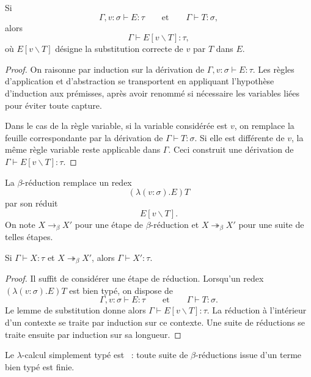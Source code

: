 \begin{lem}[Substitution]\label{substitution-lemma}
Si
\[
\Gamma,v:\sigma\vdash E:\tau
\qquad\text{et}\qquad
\Gamma\vdash T:\sigma,
\]
alors
\[
\Gamma\vdash E[v\backslash T]:\tau,
\]
où $E[v\backslash T]$ désigne la substitution correcte de $v$ par $T$
dans $E$.
\end{lem}

\begin{proof}
On raisonne par induction sur la dérivation de
$\Gamma,v:\sigma\vdash E:\tau$. Les règles d'application et
d'abstraction se transportent en appliquant l'hypothèse d'induction aux
prémisses, après avoir renommé si nécessaire les variables liées pour
éviter toute capture.

Dans le cas de la règle variable, si la variable considérée est $v$,
on remplace la feuille correspondante par la dérivation de
$\Gamma\vdash T:\sigma$. Si elle est différente de $v$, la même règle
variable reste applicable dans $\Gamma$. Ceci construit une dérivation
de $\Gamma\vdash E[v\backslash T]:\tau$.
\end{proof}

\thingy La $\beta$-réduction remplace un redex
\[
(\lambda(v:\sigma).E)T
\]
par son réduit
\[
E[v\backslash T].
\]
On note $X\rightarrow_\beta X'$ pour une étape de
$\beta$-réduction et $X\twoheadrightarrow_\beta X'$ pour une suite de
telles étapes.

\begin{prop}
Si $\Gamma\vdash X:\tau$ et
$X\twoheadrightarrow_\beta X'$, alors
$\Gamma\vdash X':\tau$.
\end{prop}

\begin{proof}
Il suffit de considérer une étape de réduction. Lorsqu'un redex
$(\lambda(v:\sigma).E)T$ est bien typé, on dispose de
\[
\Gamma,v:\sigma\vdash E:\tau
\qquad\text{et}\qquad
\Gamma\vdash T:\sigma.
\]
Le lemme de substitution donne alors
$\Gamma\vdash E[v\backslash T]:\tau$. La réduction à l'intérieur d'un
contexte se traite par induction sur ce contexte. Une suite de
réductions se traite ensuite par induction sur sa longueur.
\end{proof}

\begin{thm}
Le $\lambda$-calcul simplement typé est  :
toute suite de $\beta$-réductions issue d'un terme bien typé est finie.
\end{thm}

